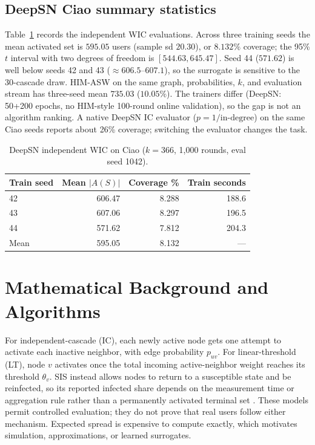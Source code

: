 \documentclass[10pt,twocolumn]{article}
\begin{document}
\subsection{DeepSN Ciao summary statistics}
Table~\ref{tab:deepsn-ciao} records the independent WIC evaluations. Across three training seeds the mean activated set is $595.05$ users (sample sd $20.30$), or $8.132\%$ coverage; the 95\% $t$ interval with two degrees of freedom is $[544.63,645.47]$. Seed 44 ($571.62$) is well below seeds 42 and 43 ($\approx 606.5$--$607.1$), so the surrogate is sensitive to the 30-cascade draw. HIM-ASW on the same graph, probabilities, $k$, and evaluation stream has three-seed mean $735.03$ ($10.05\%$). The trainers differ (DeepSN: 50+200 epochs, no HIM-style 100-round online validation), so the gap is not an algorithm ranking. A native DeepSN IC evaluator ($p=1/\mathrm{in\text{-}degree}$) on the same Ciao seeds reports about 26\% coverage; switching the evaluator changes the task.

\begin{table}[t]
\centering\footnotesize
\caption{DeepSN independent WIC on Ciao ($k=366$, 1,000 rounds, eval seed 1042).}
\label{tab:deepsn-ciao}
\begin{tabular}{@{}lrrr@{}}
\toprule
Train seed & Mean $|A(S)|$ & Coverage \% & Train seconds \\
\midrule
42 & 606.47 & 8.288 & 188.6 \\
43 & 607.06 & 8.297 & 196.5 \\
44 & 571.62 & 7.812 & 204.3 \\
Mean & 595.05 & 8.132 & --- \\
\bottomrule
\end{tabular}
\end{table}

\section{Mathematical Background and Algorithms}
For independent-cascade (IC), each newly active node gets one attempt to activate each inactive neighbor, with edge probability $p_{uv}$. For linear-threshold (LT), node $v$ activates once the total incoming active-neighbor weight reaches its threshold $\theta_v$. SIS instead allows nodes to return to a susceptible state and be reinfected, so its reported infected share depends on the measurement time or aggregation rule rather than a permanently activated terminal set \cite{pastor}. These models permit controlled evaluation; they do not prove that real users follow either mechanism. Expected spread is expensive to compute exactly, which motivates simulation, approximations, or learned surrogates.
\end{document}
